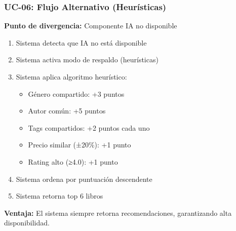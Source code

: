 \documentclass[aspectratio=169]{beamer}
\begin{document}
\begin{frame}
\frametitle{UC-06: Flujo Alternativo (Heurísticas)}

\textbf{Punto de divergencia:} Componente IA no disponible

\begin{enumerate}
\item Sistema detecta que IA no está disponible
\item Sistema activa modo de respaldo (heurísticas)
\item Sistema aplica algoritmo heurístico:
  \begin{itemize}
  \item Género compartido: +3 puntos
  \item Autor común: +5 puntos
  \item Tags compartidos: +2 puntos cada uno
  \item Precio similar (±20\%): +1 punto
  \item Rating alto (≥4.0): +1 punto
  \end{itemize}
\item Sistema ordena por puntuación descendente
\item Sistema retorna top 6 libros
\end{enumerate}

\vspace{0.3cm}

\begin{tcolorbox}[colback=yellow!5, colframe=yellow!50]
\textbf{Ventaja:} El sistema siempre retorna recomendaciones, garantizando alta disponibilidad.
\end{tcolorbox}

\end{frame}
\end{document}
